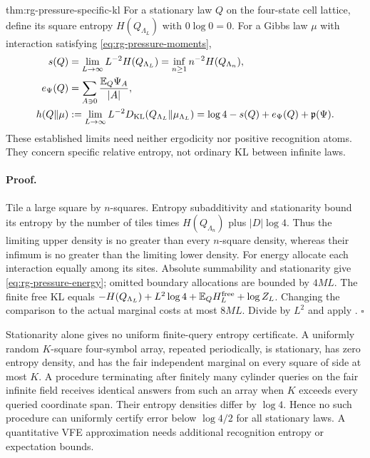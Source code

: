 {thm:rg-pressure-specific-kl}
For a stationary law $Q$ on the four-state cell lattice, define its square
entropy $H(Q_{\Lambda_L})$ with $0\log0=0$. For a Gibbs law $\mu$ with
interaction satisfying \cref{eq:rg-pressure-moments},
\begin{align}
 s(Q)&=\lim_{L\to\infty}L^{-2}H(Q_{\Lambda_L})
       =\inf_{n\geq1}n^{-2}H(Q_{\Lambda_n}),
 \label{eq:rg-pressure-entropy}\\
 e_\Psi(Q)&=\sum_{A\ni0}\frac{\mathbb E_Q\Psi_A}{|A|},
 \label{eq:rg-pressure-energy}\\
 h(Q\Vert\mu)&:=\lim_{L\to\infty}L^{-2}
       D_{\mathrm{KL}}(Q_{\Lambda_L}\Vert\mu_{\Lambda_L})
       =\log4-s(Q)+e_\Psi(Q)+\mathfrak p(\Psi).
 \label{eq:rg-pressure-specific-kl}
\end{align}
These established limits need neither ergodicity nor positive recognition
atoms. They concern specific relative entropy, not ordinary KL between
infinite laws. 

\paragraph{Proof.}
Tile a large square by $n$-squares. Entropy subadditivity and stationarity
bound its entropy by the number of tiles times $H(Q_{\Lambda_n})$ plus
$|D|\log4$. Thus the limiting upper density is no greater than every
$n$-square density, whereas their infimum is no greater than the limiting
lower density. For energy allocate each interaction equally among its
sites. Absolute summability and stationarity give
\cref{eq:rg-pressure-energy}; omitted boundary allocations are bounded by
$4ML$. The finite free KL equals
$-H(Q_{\Lambda_L})+L^2\log4+\mathbb E_QH_L^{\mathrm{free}}+\log Z_L$.
Changing the comparison to the actual marginal costs at most $8ML$.
Divide by $L^2$ and apply .
$\square$

Stationarity alone gives no uniform finite-query entropy certificate.
A uniformly random $K$-square four-symbol array, repeated periodically,
is stationary, has zero entropy density, and has the fair independent
marginal on every square of side at most $K$. A procedure terminating
after finitely many cylinder queries on the fair infinite field receives
identical answers from such an array when $K$ exceeds every queried
coordinate span. Their entropy densities differ by $\log4$. Hence no
such procedure can uniformly certify error below $\log4/2$ for all
stationary laws. A quantitative VFE approximation needs additional
recognition entropy or expectation bounds. 

